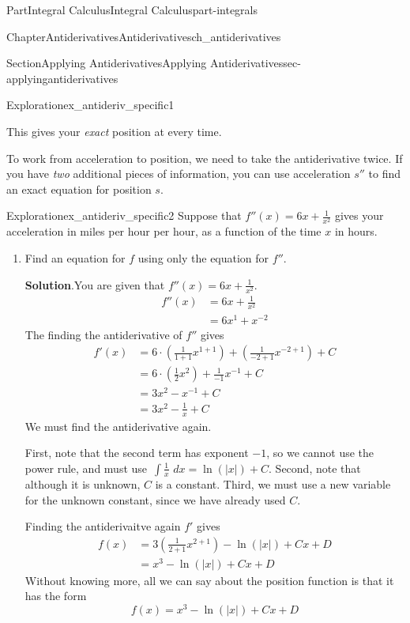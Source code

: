 \documentclass{tufte-book}
\newcommand{\blocktitlefont}{\relax}
\numberwithin{equation}{chapter}
\newcommand{\intdx}[1]{{\,\int#1\,\,dx}}
\newcommand{\amp}{&}
\begin{document}
\begin{partptx}{Part}{Integral Calculus}{}{Integral Calculus}{}{}{part-integrals}
\begin{chapterptx}{Chapter}{Antiderivatives}{}{Antiderivatives}{}{}{ch_antiderivatives}
\begin{sectionptx}{Section}{Applying Antiderivatives}{}{Applying Antiderivatives}{}{}{sec-applyingantiderivatives}
\begin{exploration}{Exploration}{}{ex_antideriv_specific1}
\begin{enumerate}[font=\bfseries,label=(\alph*),ref=\alph*]
This gives your \emph{exact} position at every time.%
\end{enumerate}%
\end{exploration}%
To work from acceleration to position, we need to take the antiderivative twice. If you have \emph{two} additional pieces of information, you can use acceleration \(s''\) to find an exact equation for position \(s\).%
\begin{exploration}{Exploration}{}{ex_antideriv_specific2}%
Suppose that \(f''(x) = 6x + \frac{1}{x^2}\) gives your acceleration in miles per hour per hour, as a function of the time \(x\) in hours.%
\begin{enumerate}[font=\bfseries,label=(\alph*),ref=\alph*]%
\item{}Find an equation for \(f\) using only the equation for \(f''\).%
\par\smallskip%
\noindent\textbf{\blocktitlefont Solution}.\hypertarget{ex_antideriv_specific2-2-2}{}\quad{}You are given that  \(f''(x) = 6x + \frac{1}{x^2}\).%
\begin{align*}
f''(x) \amp = 6x + \frac{1}{x^2}\\
\amp = 6x^1 + x^{-2} 
\end{align*}
The finding the  antiderivative of \(f''\) gives%
\begin{align*}
f'(x) \amp = 6\cdot(\frac{1}{1+1}x^{1+1}) + (\frac{1}{-2+1}x^{-2+1}) + C\\
\amp = 6\cdot(\frac{1}{2} x^2) + \frac{1}{-1}x^{-1} + C\\
\amp = 3 x^2  - x^{-1} + C \\
\amp = 3 x^2  - \frac{1}{x} + C 
\end{align*}
We must find the antiderivative again.%
\par
First, note that the second term has exponent \(-1\), so we cannot use the power rule, and must use \(\intdx{\frac{1}{x}}=\ln(|x|)+C\). Second, note that although it is unknown, \(C\) is a constant. Third, we must use a new variable for the unknown constant, since we have already used \(C\).%
\par
Finding the antiderivaitve again \(f'\) gives%
\begin{align*}
f(x) \amp = 3(\frac{1}{2+1}x^{2+1}) - \ln(|x|) + Cx + D\\
\amp = x^3 - \ln(|x|) + Cx + D
\end{align*}
Without knowing more, all we can say about the position function is that it has the form%
\begin{equation*}
f(x) = x^3 - \ln(|x|) + Cx + D

\end{equation*}
\end{enumerate}
\end{exploration}
\end{sectionptx}
\end{chapterptx}
\end{partptx}
\end{document}
